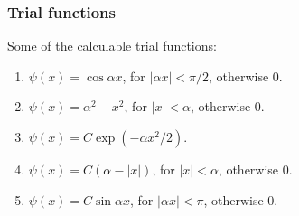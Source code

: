 \documentclass[letterpaper,10pt,english]{sphinxmanual}
\begin{document}
\subsubsection{Trial functions}
\label{approx:trial-functions}
Some of the calculable trial functions:
\begin{enumerate}
\item {} 
$\psi(x) = \cos\alpha x$, for $|\alpha x|<\pi/2$, otherwise 0.

\item {} 
$\psi(x) = \alpha^2 - x^2$, for $|x|<\alpha$, otherwise 0.

\item {} 
$\psi(x) = C \exp(-\alpha x^2/2)$.

\item {} 
$\psi(x) = C(\alpha - |x|)$, for $|x|<\alpha$, otherwise 0.

\item {} 
$\psi(x) = C\sin\alpha x$, for $|\alpha x|<\pi$, otherwise 0.

\end{enumerate}
\end{document}
